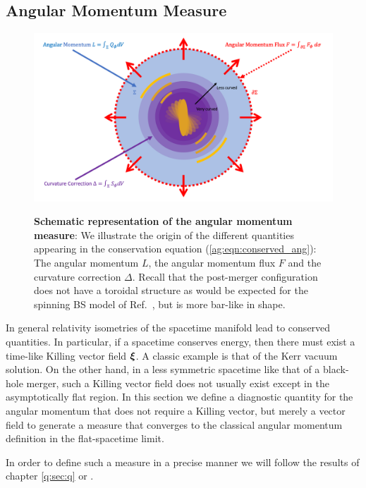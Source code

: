 \subsection{Angular Momentum Measure}\label{ag:sec:methods}

\begin{figure}[h!]
\begin{center}
    {\includegraphics[width=0.75\columnwidth]{ag_fig/FigureRobinPaper.png}}
\caption{{\bf Schematic representation of the angular momentum measure}: We illustrate the origin of the different quantities
appearing in the conservation equation
(\ref{ag:eqn:conserved_ang}): The angular momentum
    ${L}$, the {angular momentum flux} $F$ and the
    curvature correction ${\Delta}$. Recall that the post-merger
    configuration does not have a toroidal structure
    as would be expected for the spinning BS model of
    Ref.~\cite{PhysRevD.90.024068,Yoshida:1997qf}, but is more bar-like in shape.
    }
\label{ag:fig:AngMomTrick}
\end{center}
\end{figure}

In general relativity isometries of the
spacetime manifold lead to conserved quantities. In particular, if a spacetime conserves energy, then there must exist a time-like Killing vector field $\boldsymbol{\xi}$. A classic example is that of the Kerr vacuum solution. On the other hand, in a less symmetric spacetime like that of a black-hole merger, such a Killing vector field does not usually exist except in the asymptotically flat region. In this section we define a diagnostic quantity for the angular momentum that does not require a Killing vector, but merely a vector field to generate a measure that
converges to the classical angular momentum definition
in the flat-spacetime limit.

In order to define such a measure in a
precise manner we will follow the results of chapter \ref{q:sec:q} or \cite{Croft:2022gks,Clough:2021qlv}.



